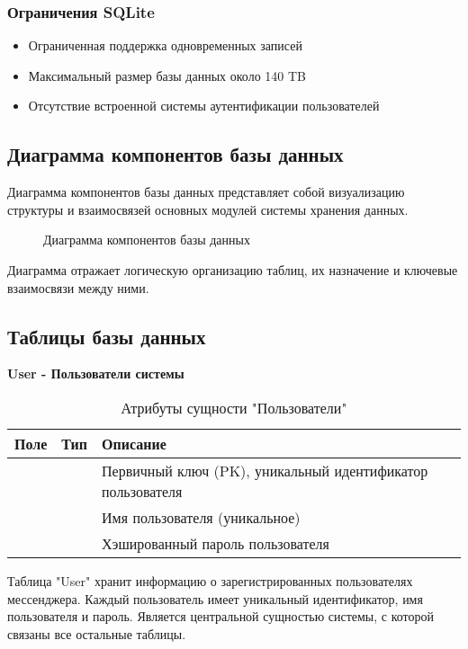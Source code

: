 \subsubsection{Ограничения SQLite}
\begin{itemize}
	\item Ограниченная поддержка одновременных записей
	\item Максимальный размер базы данных около 140 TB
	\item Отсутствие встроенной системы аутентификации пользователей
\end{itemize}

\subsection{Диаграмма компонентов базы данных}

Диаграмма компонентов базы данных представляет собой визуализацию структуры и взаимосвязей основных модулей системы хранения данных.

\begin{figure}[H]
\caption{Диаграмма компонентов базы данных}
\label{comp:image}
\end{figure}

Диаграмма отражает логическую организацию таблиц, их назначение и ключевые взаимосвязи между ними.

\subsection{Таблицы базы данных}
\textbf{User - Пользователи системы}
\begin{xltabular}{\textwidth}{|l|l|X|}
	\caption{Атрибуты сущности "Пользователи"\label{user:table}}\\ \hline
	\centrow Поле & \centrow Тип & \centrow Описание \\ \hline
	 &  & Первичный ключ (PK), уникальный идентификатор пользователя \\ \hline
	 &  & Имя пользователя (уникальное) \\ \hline
	 &  & Хэшированный пароль пользователя \\ \hline
\end{xltabular}

Таблица "User" хранит информацию о зарегистрированных пользователях мессенджера. Каждый пользователь имеет уникальный идентификатор, имя пользователя и пароль. Является центральной сущностью системы, с которой связаны все остальные таблицы.

